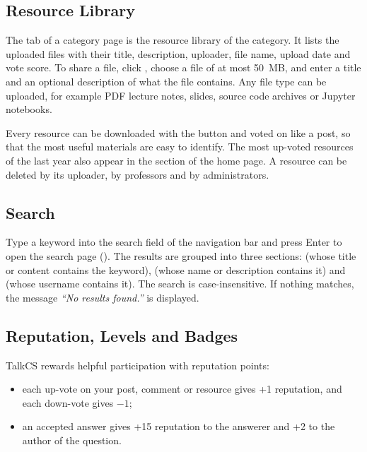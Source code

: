 
\subsection{Resource Library}

The  tab of a category page is the resource library of the category. It
lists the uploaded files with their title, description, uploader, file name, upload date
and vote score.
To share a file, click , choose a file of at most 50~MB, and enter a
title and an optional description of what the file contains. Any file type can be
uploaded, for example PDF lecture notes, slides, source code archives or Jupyter
notebooks.

Every resource can be downloaded with the  button and voted on like a
post, so that the most useful materials are easy to identify. The most up-voted
resources of the last year also appear in the  section of the
home page. A resource can be deleted by its uploader, by professors and by
administrators.


\subsection{Search}

Type a keyword into the search field of the navigation bar and press Enter to open the
search page (). The results are grouped into three sections:
 (whose title or content contains the keyword),  (whose name
or description contains it) and  (whose username contains it). The search is
case-insensitive. If nothing matches, the message \emph{``No results found.''} is
displayed.


\subsection{Reputation, Levels and Badges}
\label{sec:guide-reputation}

TalkCS rewards helpful participation with reputation points:

\begin{itemize}
  \item each up-vote on your post, comment or resource gives +1 reputation, and each
    down-vote gives $-1$;
  \item an accepted answer gives +15 reputation to the answerer and +2 to the author of
    the question.
\end{itemize}

